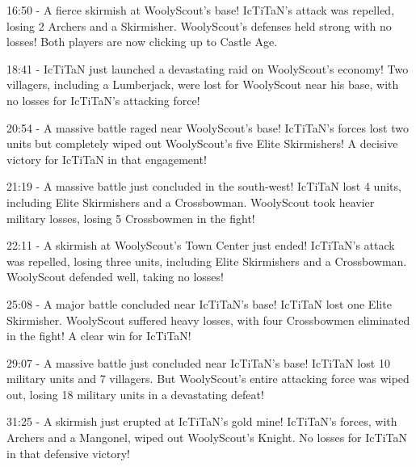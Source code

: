 16:50 - A fierce skirmish at WoolyScout's base! IcTiTaN's attack was repelled, losing 2 Archers and a Skirmisher. WoolyScout's defenses held strong with no losses! Both players are now clicking up to Castle Age. \par \vspace{1em}

18:41 - IcTiTaN just launched a devastating raid on WoolyScout's economy! Two villagers, including a Lumberjack, were lost for WoolyScout near his base, with no losses for IcTiTaN's attacking force! \par \vspace{1em}

20:54 - A massive battle raged near WoolyScout's base! IcTiTaN's forces lost two units but completely wiped out WoolyScout's five Elite Skirmishers! A decisive victory for IcTiTaN in that engagement! \par \vspace{1em}

21:19 - A massive battle just concluded in the south-west! IcTiTaN lost 4 units, including Elite Skirmishers and a Crossbowman. WoolyScout took heavier military losses, losing 5 Crossbowmen in the fight! \par \vspace{1em}

22:11 - A skirmish at WoolyScout's Town Center just ended! IcTiTaN's attack was repelled, losing three units, including Elite Skirmishers and a Crossbowman. WoolyScout defended well, taking no losses! \par \vspace{1em}

25:08 - A major battle concluded near IcTiTaN's base! IcTiTaN lost one Elite Skirmisher. WoolyScout suffered heavy losses, with four Crossbowmen eliminated in the fight! A clear win for IcTiTaN! \par \vspace{1em}

29:07 - A massive battle just concluded near IcTiTaN's base! IcTiTaN lost 10 military units and 7 villagers. But WoolyScout's entire attacking force was wiped out, losing 18 military units in a devastating defeat! \par \vspace{1em}

31:25 - A skirmish just erupted at IcTiTaN's gold mine! IcTiTaN's forces, with Archers and a Mangonel, wiped out WoolyScout's Knight. No losses for IcTiTaN in that defensive victory! \par \vspace{1em}

